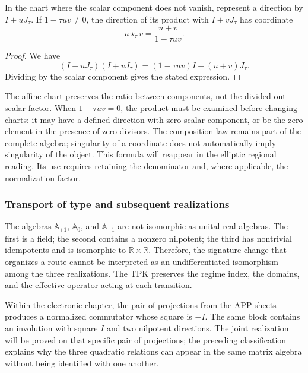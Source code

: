 \begin{proposition}
\label{trit-ampl-prop-pendientes}
In the chart where the scalar component does not vanish, represent a
direction by \(I+uJ_\tau\). If \(1-\tau uv\ne0\), the direction of its
product with \(I+vJ_\tau\) has coordinate
\[
 u\star_\tau v=\frac{u+v}{1-\tau uv}.
\]
\end{proposition}
\begin{proof}
We have
\[
 (I+uJ_\tau)(I+vJ_\tau)
   =(1-\tau uv)I+(u+v)J_\tau.
\]
Dividing by the scalar component gives the stated expression.
\end{proof}

The affine chart preserves the ratio between components, not the divided-out
scalar factor. When \(1-\tau uv=0\), the product must be examined before
changing charts: it may have a defined direction with zero scalar component,
or be the zero element in the presence of zero divisors. The composition
law remains part of the complete algebra; singularity of a coordinate does not
automatically imply singularity of the object.
This formula will reappear in the elliptic regional reading. Its use requires
retaining the denominator and, where applicable, the normalization factor.

\subsubsection{Transport of type and subsequent realizations}
\label{trit-ampl-puentes}

The algebras \(\mathbb A_{+1}\), \(\mathbb A_0\), and
\(\mathbb A_{-1}\) are not isomorphic as unital real algebras.
The first is a field; the second contains a nonzero nilpotent; the
third has nontrivial idempotents and is isomorphic to
\(\mathbb R\times\mathbb R\). Therefore, the signature change that organizes a
route cannot be interpreted as an undifferentiated isomorphism among the
three realizations. The TPK preserves the regime index, the domains, and the
effective operator acting at each transition.

Within the electronic chapter, the pair of projections from the APP sheets
produces a normalized commutator whose square is \(-I\). The same block
contains an involution with square \(I\) and two nilpotent directions. The
joint realization will be proved on that specific pair of projections;
the preceding classification explains why the three quadratic relations
can appear in the same matrix algebra without being identified with one another.

